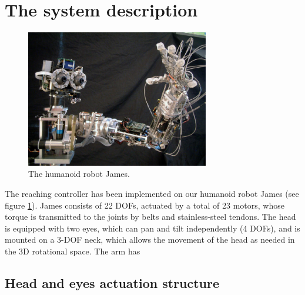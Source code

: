 \section{The system description}

\begin{figure}[h!tbp]
\centering
\includegraphics[width=80mm]{Figure/James1.eps}
\caption{The humanoid robot James.}
\label{Fig:PicureJames}
\end{figure}

The reaching controller has been implemented on our humanoid robot James (see figure \ref{Fig:PicureJames}). James consists of 22 DOFs, actuated by a total of 23 motors, whose torque is transmitted to the joints by belts and stainless-steel tendons. The head is equipped with two eyes, which can pan and tilt independently (4 DOFs), and is mounted on a 3-DOF neck, which allows the movement of the head as needed in the 3D rotational space. The
arm has 


\subsection{Head and eyes actuation structure} \label{Sec:HeadEyesStructure}

